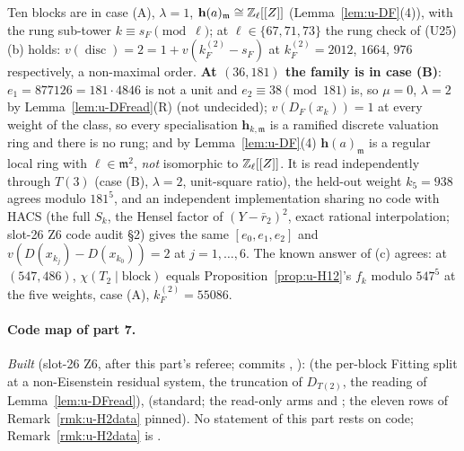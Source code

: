 \documentclass[11pt]{article}
\newcommand{\hcusp}{\mathbf{h}}                   %
\newcommand{\Zl}{\Z_\ell}
\begin{document}
\begin{remark}
Ten blocks are in case (A), $\lambda=1$, $\hcusp(a)_{\mathfrak m}\cong\Zl[[Z]]$ (Lemma~\ref{lem:u-DF}(4)), with the rung sub-tower $k\equiv s_F\pmod\ell$; at $\ell\in\{67,71,73\}$ the
rung check of (U25)(b) holds: $v(\operatorname{disc})=2=1+v(k^{(2)}_F-s_F)$ at $k^{(2)}_F=2012$, $1664$, $976$ respectively, a non-maximal order.
\textbf{At $(36,181)$ the family is in case (B)}: $e_1=877126=181\cdot4846$ is not a unit and $e_2\equiv38\pmod{181}$ is, so $\mu=0$, $\lambda=2$ by Lemma~\ref{lem:u-DFread}(R) (not
undecided); $v(D_F(x_k))=1$ at every weight of the class, so every specialisation $\hcusp_{k,\mathfrak m}$ is a ramified discrete valuation ring and there is no rung; and by
Lemma~\ref{lem:u-DF}(4) $\hcusp(a)_{\mathfrak m}$ is a regular local ring with $\ell\in\mathfrak m^{2}$, \emph{not} isomorphic to $\Zl[[Z]]$. It is read independently through
$T(3)$ (case (B), $\lambda=2$, unit-square ratio), the held-out weight $k_5=938$ agrees modulo $181^{5}$, and an independent implementation sharing no code with HACS (the full
$S_k$, the Hensel factor of $(Y-\bar r_2)^{2}$, exact rational interpolation; slot-26 Z6 code audit \S2) gives the same $[e_0,e_1,e_2]$ and $v(D(x_{k_j})-D(x_{k_0}))=2$ at
$j=1,\dots,6$. The known answer of (c) agrees: at $(547,486)$, $\chi(T_2\mid\text{block})$ equals Proposition~\ref{prop:u-H12}'s $f_k$ modulo $547^{5}$ at the five weights, case (A), $k^{(2)}_F=55086$.
\end{remark}

\paragraph{Code map of part 7.} \emph{Built} (slot-26 Z6, after this part's referee; commits , ):  (the per-block Fitting split at a
non-Eisenstein residual system, the truncation of $D_{T(2)}$, the reading of Lemma~\ref{lem:u-DFread}),  (standard; the read-only arms
 and ; the eleven rows of Remark~\ref{rmk:u-H2data} pinned). No statement of this part rests on code; Remark~\ref{rmk:u-H2data} is \COMP.




\appendix
\sloppy
\end{document}

